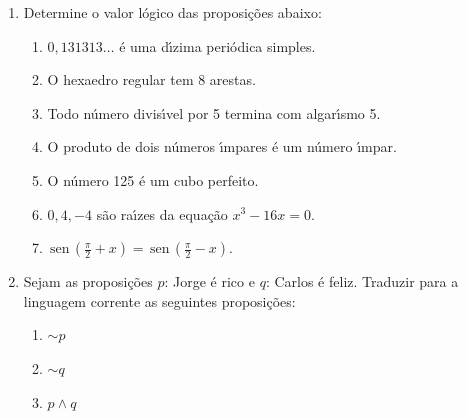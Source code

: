 \documentclass[a4paper,5pt]{amsbook}
\newcommand{\sen}{\,\mbox{sen}\,}
\renewcommand{\lnot}{\sim}
\begin{document}
\vspace{1cm}
\begin{enumerate}
    \item Determine o valor l\'ogico das proposi\c{c}\~oes abaixo:
        \begin{enumerate}
            \item $0,131313\ldots$ \'e uma d\'{\i}zima peri\'odica simples.
            \item O hexaedro regular tem 8 arestas.
            \item Todo n\'umero divis\'{\i}vel por 5 termina com algar\'{\i}smo 5.
            \item O produto de dois n\'umeros \'{\i}mpares \'e um n\'umero \'{\i}mpar.
            \item O n\'umero 125 \'e um cubo perfeito.
            \item $0, 4, -4$ s\~ao ra\'{\i}zes da equa\c{c}\~ao $x^3-16x=0$.
            \item $\sen{\left(\frac{\pi}{2}+x\right)} = \sen{\left(\frac{\pi}{2}-x\right)}$.
        \end{enumerate}

    \item Sejam as proposi\c{c}\~oes $p$: Jorge \'e rico e $q$: Carlos \'e feliz. Traduzir para a linguagem corrente as seguintes proposi\c{c}\~oes:
        \begin{enumerate}
            \item $\lnot p$
            \item $\lnot q$
            \item $p \land q$
        \end{enumerate}



\end{enumerate}
\end{document}
